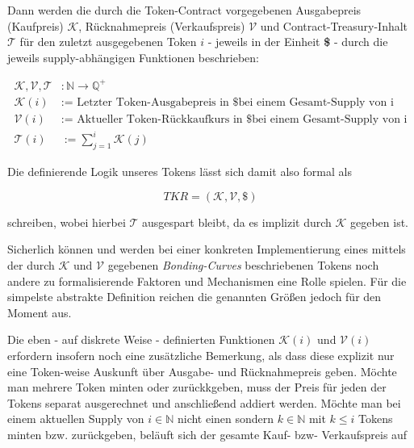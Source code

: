 \begin{Def}
Dann werden die durch die Token-Contract vorgegebenen Ausgabepreis (Kaufpreis) $\mathcal{K}$, Rücknahmepreis (Verkaufspreis) $\mathcal{V}$ und Contract-Treasury-Inhalt $\mathbf{\mathcal{T}}$ für den zuletzt ausgegebenen Token $i$ - jeweils in der Einheit \textbf{\$} - durch die jeweils supply-abhängigen Funktionen beschrieben:

\begin{align*}
\mathcal{K}, \mathcal{V}, \mathcal{T} &: \mathbb{N} \rightarrow \mathbb{Q}^{+} \\
\mathcal{K} \left( i \right) &:= \textrm{ Letzter Token-Ausgabepreis in \$ bei einem Gesamt-Supply von i} \\
\mathcal{V} \left( i \right) &:= \textrm{ Aktueller Token-Rückkaufkurs in \$ bei einem Gesamt-Supply von i} \\
\mathcal{T} \left( i \right) &:= \sum_{j = 1}^{i} \mathcal{K} \left( j \right)
\end{align*}

\vspace{0.2cm}

Die definierende Logik unseres Tokens lässt sich damit also formal als 

\begin{equation*}
TKR = \left( \mathcal{K}, \mathcal{V}, \$ \right)
\end{equation*}

schreiben, wobei hierbei $\mathbf{\mathcal{T}}$ ausgespart bleibt, da es implizit durch $\mathbf{\mathcal{K}}$ gegeben ist.

\vspace{0.2cm}

Sicherlich können und werden bei einer konkreten Implementierung eines mittels der durch $\mathbf{\mathcal{K}}$ und $\mathbf{\mathcal{V}}$ gegebenen \textit{Bonding-Curves} beschriebenen Tokens noch andere zu formalisierende Faktoren und Mechanismen eine Rolle spielen. Für die simpelste abstrakte Definition reichen die genannten Größen 
jedoch für den Moment aus.

\end{Def}

\vspace{0.3cm}

Die eben - auf diskrete Weise - definierten Funktionen $\mathcal{K} \left( i \right)$ und $\mathcal{V} \left( i \right)$ erfordern insofern noch eine zusätzliche Bemerkung, als dass diese explizit nur eine Token-weise Auskunft über Ausgabe- und Rücknahmepreis geben. Möchte man mehrere Token minten oder zurückkgeben, muss der Preis für jeden der Tokens separat ausgerechnet und anschließend addiert werden. Möchte man bei einem aktuellen Supply von $i \in \mathbb{N}$ nicht einen sondern $k \in \mathbb{N}$ mit $k \leq i$ Tokens minten bzw. zurückgeben, beläuft sich der gesamte Kauf- bzw- Verkaufspreis auf

